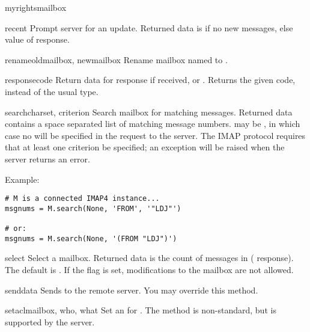 \begin{methoddes}{myrights}{mailbox}
\begin{methoddesc}{recent}{}
  Prompt server for an update. Returned data is  if no new
  messages, else value of  response.
\end{methoddesc}

\begin{methoddesc}{rename}{oldmailbox, newmailbox}
  Rename mailbox named  to .
\end{methoddesc}

\begin{methoddesc}{response}{code}
  Return data for response  if received, or
  . Returns the given code, instead of the usual type.
\end{methoddesc}

\begin{methoddesc}{search}{charset, criterion}
  Search mailbox for matching messages.  Returned data contains a space
  separated list of matching message numbers.   may be
  , in which case no  will be specified in the
  request to the server.  The IMAP protocol requires that at least one
  criterion be specified; an exception will be raised when the server
  returns an error.

  Example:

\begin{verbatim}
# M is a connected IMAP4 instance...
msgnums = M.search(None, 'FROM', '"LDJ"')

# or:
msgnums = M.search(None, '(FROM "LDJ")')
\end{verbatim}
\end{methoddesc}

\begin{methoddesc}{select}{}
  Select a mailbox. Returned data is the count of messages in
   ( response).  The default 
  is .  If the  flag is set, modifications
  to the mailbox are not allowed.
\end{methoddesc}

\begin{methoddesc}{send}{data}
  Sends  to the remote server.
  You may override this method.
\end{methoddesc}

\begin{methoddesc}{setacl}{mailbox, who, what}
  Set an  for .
  The method is non-standard, but is supported by the  server.
\end{methoddesc}


\end{methoddes}
